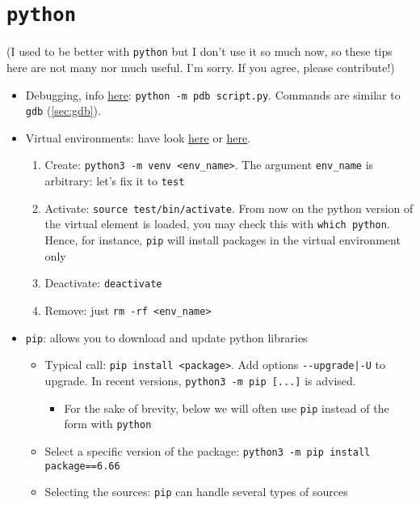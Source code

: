 \documentclass[a4paper,12pt,%
              final%
              ]{article}
\begin{document}
\section{\texttt{python}}
\label{sec:python}
(I used to be better with \texttt{python} but I don't use it so much now, so these tips here are not many nor much useful. I'm sorry. If you agree, please contribute!)
\begin{itemize}
  \item Debugging, info \href{https://docs.python.org/2/library/pdb.html}{here}: \texttt{python -m pdb script.py}. Commands are similar to \texttt{gdb} (\ref{sec:gdb}).
  \item Virtual environments: have look \href{https://packaging.python.org/guides/installing-using-pip-and-virtual-environments/}{here} or \href{https://docs.python.org/3/tutorial/venv.html}{here}.
    \begin{enumerate}
      \item Create: \verb|python3 -m venv <env_name>|. The argument \verb|env_name| is arbitrary: let's fix it to \verb|test|
      \item Activate: \verb|source test/bin/activate|. From now on the python version of the virtual element is loaded, you may check this with \verb|which python|. Hence, for instance, \verb|pip| will install packages in the virtual environment only
      \item Deactivate: \verb|deactivate|
      \item Remove: just \verb|rm -rf <env_name>|
    \end{enumerate}
  \item \texttt{pip}: allows you to download and update python libraries
    \begin{itemize}
      \item Typical call: \verb|pip install <package>|. Add options \verb!--upgrade|-U! to upgrade. In recent versions, \verb|python3 -m pip [...]| is advised.
        \begin{itemize}
          \item For the sake of brevity, below we will often use \texttt{pip} instead of the form with \texttt{python}
        \end{itemize}
      \item Select a specific version of the package: \verb|python3 -m pip install package==6.66|
      \item Selecting the sources: \texttt{pip} can handle several types of sources
        \begin{itemize}

\end{itemize}
\end{itemize}
\end{itemize}
\end{document}
